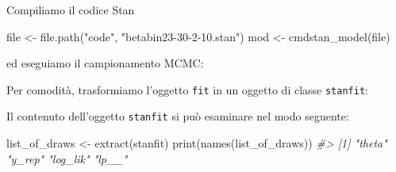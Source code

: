 \documentclass[
  11pt,
  italian,
  a4paper,
  extrafontsizes,onecolumn,openright
  ]{memoir}
\newenvironment{Shaded}{\begin{snugshade}}{\end{snugshade}}
\newcommand{\AttributeTok}[1]{\textcolor[rgb]{0.77,0.63,0.00}{#1}}
\newcommand{\CommentTok}[1]{\textcolor[rgb]{0.56,0.35,0.01}{\textit{#1}}}
\newcommand{\DecValTok}[1]{\textcolor[rgb]{0.00,0.00,0.81}{#1}}
\newcommand{\FunctionTok}[1]{\textcolor[rgb]{0.00,0.00,0.00}{#1}}
\newcommand{\NormalTok}[1]{#1}
\newcommand{\OtherTok}[1]{\textcolor[rgb]{0.56,0.35,0.01}{#1}}
\newcommand{\SpecialCharTok}[1]{\textcolor[rgb]{0.00,0.00,0.00}{#1}}
\newcommand{\StringTok}[1]{\textcolor[rgb]{0.31,0.60,0.02}{#1}}
\theoremstyle{definition}
\theoremstyle{definition}
\theoremstyle{definition}
\theoremstyle{definition}
\theoremstyle{remark}
\begin{document}
\noindent
Compiliamo il codice Stan

\begin{Shaded}
\begin{Highlighting}[]
\NormalTok{file }\OtherTok{\textless{}{-}} \FunctionTok{file.path}\NormalTok{(}\StringTok{"code"}\NormalTok{, }\StringTok{"betabin23{-}30{-}2{-}10.stan"}\NormalTok{)}
\NormalTok{mod }\OtherTok{\textless{}{-}} \FunctionTok{cmdstan\_model}\NormalTok{(file)}
\end{Highlighting}
\end{Shaded}

\noindent
ed eseguiamo il campionamento MCMC:

\begin{Shaded}
\end{Shaded}

\noindent
Per comodità, trasformiamo l'oggetto \texttt{fit} in un oggetto di classe \texttt{stanfit}:

\begin{Shaded}
\end{Shaded}

\noindent
Il contenuto dell'oggetto \texttt{stanfit} si può esaminare nel modo seguente:

\begin{Shaded}
\begin{Highlighting}[]
\NormalTok{list\_of\_draws }\OtherTok{\textless{}{-}} \FunctionTok{extract}\NormalTok{(stanfit)}
\FunctionTok{print}\NormalTok{(}\FunctionTok{names}\NormalTok{(list\_of\_draws))}
\CommentTok{\#\textgreater{} [1] "theta"   "y\_rep"   "log\_lik" "lp\_\_"}
\end{Highlighting}
\end{Shaded}
\end{document}

